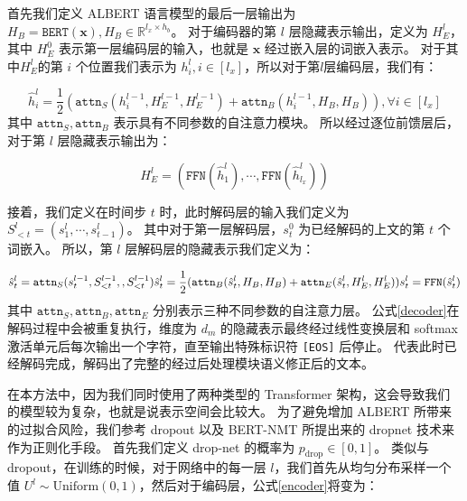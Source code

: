 首先我们定义 ALBERT 语言模型的最后一层输出为 $H_B = \texttt{BERT}(\bm{x}), H_B\in \mathbb{R}^{l_x \times h_b}$。
对于编码器的第 $l$ 层隐藏表示输出，定义为 $H_E^l$，其中 $H_E^0$ 表示第一层编码层的输入，也就是 $\bm{x}$ 经过嵌入层的词嵌入表示。
对于其中$H_E^l$的第 $i$ 个位置我们表示为 $h_i^l, i \in [l_x]$，所以对于第$l$层编码层，我们有：

\begin{equation}
	\label{encoder}
	\hat{h}_i^l = \frac{1}{2} (\texttt{attn}_S(h^{l-1}_i, H_E^{l-1}, H_E^{l-1}) + \texttt{attn}_B(h_i^{l-1}, H_B, H_B)), \forall i \in [l_x]
\end{equation}
其中 $\texttt{attn}_S, \texttt{attn}_B$ 表示具有不同参数的自注意力模块。
所以经过逐位前馈层后，对于第 $l$ 层隐藏表示输出为：

\begin{equation}
	H_E^l = (\texttt{FFN}(\hat{h}_1^l), \cdots, \texttt{FFN}(\hat{h}_{l_x}^l))
\end{equation}

接着，我们定义在时间步 $t$ 时，此时解码层的输入我们定义为 $S_{<t}^l = (s_1^l, \cdots, s_{t-1}^l)$。
其中对于第一层解码层，$s_t^0$ 为已经解码的上文的第 $t$ 个词嵌入。
所以，第 $l$ 层解码层的隐藏表示我们定义为：

\begin{equation}
	\label{decoder}
	\hat{s}_{t}^l = \texttt{attn}_S(s_t^{l-1}, S_{<t}^{l-1}, , S_{<t}^{l-1}) \\
	\hat{s}_{t}^l = \frac{1}{2}(\texttt{attn}_B(\hat{s}_t^{l}, H_B, H_B) + \texttt{attn}_E(\hat{s}_t^l, H_E^l, H_E^l)) \\
	s_t^l = \texttt{FFN}(\hat{s}_t^l)
\end{equation}
其中 $\texttt{attn}_S, \texttt{attn}_B, \texttt{attn}_E$ 分别表示三种不同参数的自注意力层。
公式\ref{decoder}在解码过程中会被重复执行，维度为 $d_m$ 的隐藏表示最终经过线性变换层和 softmax 激活单元后每次输出一个字符，直至输出特殊标识符 \texttt{[EOS]} 后停止。
代表此时已经解码完成，解码出了完整的经过后处理模块语义修正后的文本。

在本方法中，因为我们同时使用了两种类型的 Transformer 架构，这会导致我们的模型较为复杂，也就是说表示空间会比较大。
为了避免增加 ALBERT 所带来的过拟合风险，我们参考 dropout\cite{dropout} 以及 BERT-NMT\cite{bert_nmt} 所提出来的 dropnet 技术来作为正则化手段。
首先我们定义 drop-net 的概率为 $p_{\text{drop}} \in [0,1]$。
类似与 dropout，在训练的时候，对于网络中的每一层 $l$，我们首先从均匀分布采样一个值 $U^l \sim \text{Uniform}(0,1)$，然后对于编码层，公式\ref{encoder}将变为：

